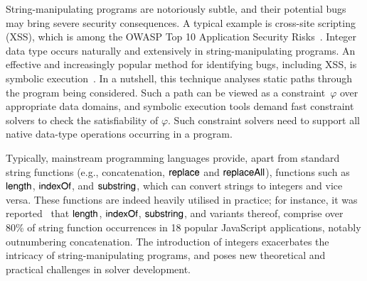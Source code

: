 

String-manipulating programs are notoriously subtle, and their potential bugs %
may bring severe security consequences. A typical example is cross-site scripting
(XSS), which is among the OWASP Top 10 Application Security Risks~\cite{owasp17}.
Integer data type occurs naturally and extensively in string-manipulating programs. %
%
An effective and increasingly popular method for identifying bugs, including XSS, is symbolic execution~\cite{symbex-survey}.
In a nutshell, this technique analyses static paths
 through the program being considered.
Such a path can be viewed as a constraint~$\varphi$ over
appropriate data domains, and symbolic execution tools
demand fast constraint
solvers to check the satisfiability of $\varphi$. Such constraint
solvers need to support all native data-type operations occurring in
a program.

Typically, mainstream programming languages provide, apart from standard string functions (e.g., concatenation, $\mathsf{replace}$ and $\mathsf{replaceAll}$), %
functions such as $\mathsf{length}$, $\mathsf{indexOf}$, and $\mathsf{substring}$, which can convert strings to integers and vice versa. %
These functions are indeed heavily utilised in practice; for instance, it was reported~\cite{Berkeley-JavaScript} that $\mathsf{length}$, $\mathsf{indexOf}$, $\mathsf{substring}$, and variants thereof, comprise over 80\% of string function occurrences in 18 popular JavaScript applications, notably outnumbering concatenation. The introduction of integers exacerbates the intricacy of string-manipulating programs, and poses new theoretical and practical challenges in solver development. 





